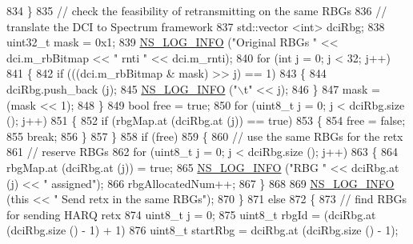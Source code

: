 \begin{DoxyCode}
834             \}
835           \textcolor{comment}{// check the feasibility of retransmitting on the same RBGs}
836           \textcolor{comment}{// translate the DCI to Spectrum framework}
837           std::vector <int> dciRbg;
838           uint32\_t mask = 0x1;
839           \hyperlink{group__logging_gafbd73ee2cf9f26b319f49086d8e860fb}{NS\_LOG\_INFO} (\textcolor{stringliteral}{"Original RBGs "} << dci.m\_rbBitmap << \textcolor{stringliteral}{" rnti "} << dci.m\_rnti);
840           \textcolor{keywordflow}{for} (\textcolor{keywordtype}{int} j = 0; j < 32; j++)
841             \{
842               \textcolor{keywordflow}{if} (((dci.m\_rbBitmap & mask) >> j) == 1)
843                 \{
844                   dciRbg.push\_back (j);
845                   \hyperlink{group__logging_gafbd73ee2cf9f26b319f49086d8e860fb}{NS\_LOG\_INFO} (\textcolor{stringliteral}{"\(\backslash\)t"} << j);
846                 \}
847               mask = (mask << 1);
848             \}
849           \textcolor{keywordtype}{bool} free = \textcolor{keyword}{true};
850           \textcolor{keywordflow}{for} (uint8\_t j = 0; j < dciRbg.size (); j++)
851             \{
852               \textcolor{keywordflow}{if} (rbgMap.at (dciRbg.at (j)) == \textcolor{keyword}{true})
853                 \{
854                   free = \textcolor{keyword}{false};
855                   \textcolor{keywordflow}{break};
856                 \}
857             \}
858           \textcolor{keywordflow}{if} (free)
859             \{
860               \textcolor{comment}{// use the same RBGs for the retx}
861               \textcolor{comment}{// reserve RBGs}
862               \textcolor{keywordflow}{for} (uint8\_t j = 0; j < dciRbg.size (); j++)
863                 \{
864                   rbgMap.at (dciRbg.at (j)) = \textcolor{keyword}{true};
865                   \hyperlink{group__logging_gafbd73ee2cf9f26b319f49086d8e860fb}{NS\_LOG\_INFO} (\textcolor{stringliteral}{"RBG "} << dciRbg.at (j) << \textcolor{stringliteral}{" assigned"});
866                   rbgAllocatedNum++;
867                 \}
868 
869               \hyperlink{group__logging_gafbd73ee2cf9f26b319f49086d8e860fb}{NS\_LOG\_INFO} (\textcolor{keyword}{this} << \textcolor{stringliteral}{" Send retx in the same RBGs"});
870             \}
871           \textcolor{keywordflow}{else}
872             \{
873               \textcolor{comment}{// find RBGs for sending HARQ retx}
874               uint8\_t j = 0;
875               uint8\_t rbgId = (dciRbg.at (dciRbg.size () - 1) + 1) %
876               uint8\_t startRbg = dciRbg.at (dciRbg.size () - 1);

\end{DoxyCode}
